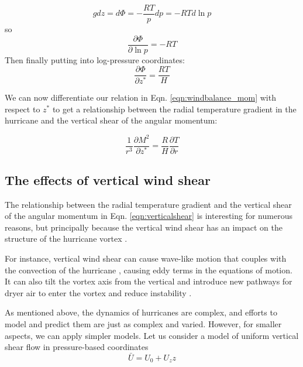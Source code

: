 \begin{equation*}
    gdz = d\Phi=-\frac{RT}{p}dp=-RTd\ln p
\end{equation*}
so
\begin{equation*}
    \frac{\partial\Phi}{\partial \ln p}=-RT
\end{equation*}
Then finally putting into log-pressure coordinates:
\begin{equation*}
    \frac{\partial \Phi}{\partial z^*}=\frac{RT}{H}
\end{equation*}

We can now differentiate our relation in Eqn. \ref{eqn:windbalance_mom} with respect to $z^*$ to get a relationship between the radial temperature gradient in the hurricane and the vertical shear of the angular momentum:

\begin{equation}
    \frac{1}{r^3}\frac{\partial M^2}{\partial z^*}=\frac{R}{H}\frac{\partial T}{\partial r}
    \label{eqn:verticalshear}
\end{equation}


\subsection{The effects of vertical wind shear}

The relationship between the radial temperature gradient and the vertical shear of the angular momentum in Eqn. \ref{eqn:verticalshear} is interesting for numerous reasons, but principally because the vertical wind shear has an impact on the structure of the hurricane vortex \cite{smith_montgomery_2017}.

For instance, vertical wind shear can cause wave-like motion \cite{reasormontgomery2015} that couples with the convection of the hurricane \cite{reimer2013}, causing eddy terms in the equations of motion. It can also tilt the vortex axis from the vertical \cite{Jones1995} and introduce new pathways for dryer air to enter the vortex and reduce instability \cite{reimer2013}. 

As mentioned above, the dynamics of hurricanes are complex, and efforts to model and predict them are just as complex and varied. However, for smaller aspects, we can apply simpler models. Let us consider a model of uniform vertical shear flow in pressure-based coordinates
\begin{equation}
    \bar{U}=U_0+U_z z
\end{equation}


